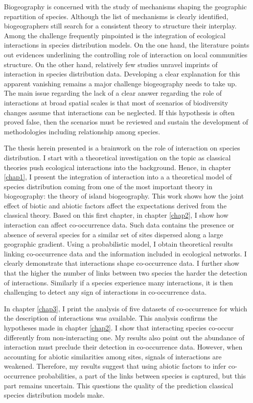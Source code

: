 Biogeography is concerned with the study of mechanisms shaping the
geographic repartition of species. Although the list of mechanisms is
clearly identified, biogeographers still search for a consistent theory
to structure their interplay. Among the challenge frequently pinpointed
is the integration of ecological interactions in species distribution
models. On the one hand, the literature points out evidences underlining
the controlling role of interaction on local communities structure. On
the other hand, relatively few studies unravel imprints of interaction
in species distribution data. Developing a clear explanation for this
apparent vanishing remains a major challenge biogeography needs to take
up. The main issue regarding the lack of a clear answer regarding the
role of interactions at broad spatial scales is that most of scenarios
of biodiversity changes assume that interactions can be neglected. If
this hypothesis is often proved false, then the scenarios must be
reviewed and sustain the development of methodologies including
relationship among species.

The thesis herein presented is a brainwork on the role of interaction on
species distribution. I start with a theoretical investigation on the
topic as classical theories push ecological interactions into the
background. Hence, in chapter \ref{chap1}, I present the integration of
interaction into a a theoretical model of species distribution coming
from one of the most important theory in biogeography: the theory of
island biogeography. This work shows how the joint effect of biotic and
abiotic factors affect the expectations derived from the classical
theory. Based on this first chapter, in chapter \ref{chap2}, I show how
interaction can affect co-occurrence data. Such data contains the
presence or absence of several species for a similar set of sites
dispersed along a large geographic gradient. Using a probabilistic
model, I obtain theoretical results linking co-occurrence data and the
information included in ecological networks. I clearly demonstrate that
interactions shape co-occurrence data. I further show that the higher
the number of links between two species the harder the detection of
interactions. Similarly if a species experience many interactions, it is
then challenging to detect any sign of interactions in co-occurrence
data.

In chapter \ref{chap3}, I print the analysis of five datasets of
co-occurrence for which the description of interactions was available.
This analysis confirms the hypotheses made in chapter \ref{chap2}. I
show that interacting species co-occur differently from non-interacting
one. My results also point out the abundance of interaction must
preclude their detection in co-occurrence data. However, when accounting
for abiotic similarities among sites, signals of interactions are
weakened. Therefore, my results suggest that using abiotic factors to
infer co-occurrence probabilities, a part of the links between species
is captured, but this part remains uncertain. This questions the quality
of the prediction classical species distribution models make.

